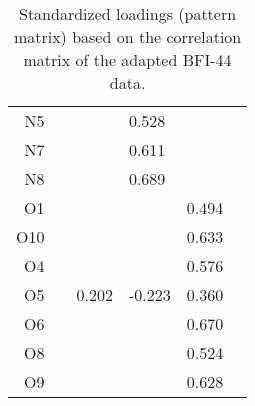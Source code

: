 \begin{table}[ht]
\begin{tabular}{rlllll}
  N5 &        &        &  0.528 &        &        \\ 
  N7 &        &        &  0.611 &        &        \\ 
  N8 &        &        &  0.689 &        &        \\ 
  O1 &        &        &        &  0.494 &        \\ 
  O10 &        &        &        &  0.633 &        \\ 
  O4 &        &        &        &  0.576 &        \\ 
  O5 &        &  0.202 & -0.223 &  0.360 &        \\ 
  O6 &        &        &        &  0.670 &        \\ 
  O8 &        &        &        &  0.524 &        \\ 
  O9 &        &        &        &  0.628 &        \\ 
   \bottomrule
\end{tabular}
\caption{Standardized loadings (pattern matrix) based on the correlation matrix of the adapted BFI-44 data.} 
\label{tab:loadingsbfifiltered}
\end{table}
